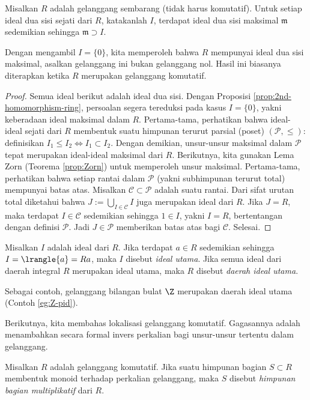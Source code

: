 \begin{proposition}\label{prop:existence-maximal-ideal}
	Misalkan $R$ adalah gelanggang sembarang (tidak harus komutatif). Untuk setiap ideal dua sisi sejati dari $R$, katakanlah $I$, terdapat ideal dua sisi maksimal $\mathfrak{m}$ sedemikian sehingga $\mathfrak{m} \supset I$.
\end{proposition}
Dengan mengambil $I=\{0\}$, kita memperoleh bahwa $R$ mempunyai ideal dua sisi maksimal, asalkan gelanggang ini bukan gelanggang nol. Hasil ini biasanya diterapkan ketika $R$ merupakan gelanggang komutatif.
\begin{proof}
	Semua ideal berikut adalah ideal dua sisi. Dengan Proposisi \ref{prop:2nd-homomorphism-ring}, persoalan segera tereduksi pada kasus $I=\{0\}$, yakni keberadaan ideal maksimal dalam $R$. Pertama-tama, perhatikan bahwa ideal-ideal sejati dari $R$ membentuk suatu himpunan terurut parsial (poset) $(\mathcal{P}, \leq)$: definisikan $I_1 \leq I_2 \iff I_1 \subset I_2$. Dengan demikian, unsur-unsur maksimal dalam $\mathcal{P}$ tepat merupakan ideal-ideal maksimal dari $R$. Berikutnya, kita gunakan Lema Zorn (Teorema \ref{prop:Zorn}) untuk memperoleh unsur maksimal. Pertama-tama, perhatikan bahwa setiap rantai dalam $\mathcal{P}$ (yakni subhimpunan terurut total) mempunyai batas atas. Misalkan $\mathcal{C} \subset \mathcal{P}$ adalah suatu rantai. Dari sifat urutan total diketahui bahwa $J := \bigcup_{I \in \mathcal{C}} I$ juga merupakan ideal dari $R$. Jika $J = R$, maka terdapat $I \in \mathcal{C}$ sedemikian sehingga $1 \in I$, yakni $I = R$, bertentangan dengan definisi $\mathcal{P}$. Jadi $J \in \mathcal{P}$ memberikan batas atas bagi $\mathcal{C}$. Selesai.
\end{proof}

\begin{definition}\label{def:PID}
	Misalkan $I$ adalah ideal dari $R$. Jika terdapat $a \in R$ sedemikian sehingga $I = \lrangle{a} = Ra$, maka $I$ disebut \emph{ideal utama}. Jika semua ideal dari daerah integral $R$ merupakan ideal utama, maka $R$ disebut \emph{daerah ideal utama}.
\end{definition}
Sebagai contoh, gelanggang bilangan bulat $\Z$ merupakan daerah ideal utama (Contoh \ref{eg:Z-pid}).

Berikutnya, kita membahas lokalisasi gelanggang komutatif. Gagasannya adalah menambahkan secara formal invers perkalian bagi unsur-unsur tertentu dalam gelanggang.
\begin{definition}
	Misalkan $R$ adalah gelanggang komutatif. Jika suatu himpunan bagian $S \subset R$ membentuk monoid terhadap perkalian gelanggang, maka $S$ disebut \emph{himpunan bagian multiplikatif} dari $R$.
\end{definition}

